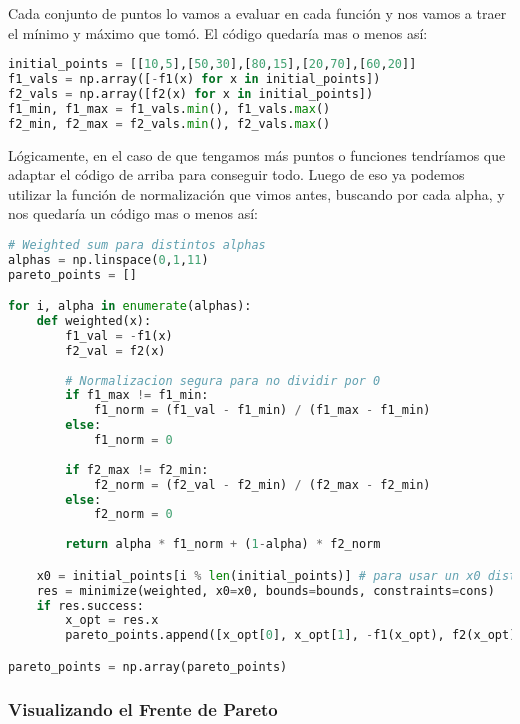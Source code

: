 \documentclass[12pt]{article}
\begin{document}
\vspace{0.5em}

Cada conjunto de puntos lo vamos a evaluar en cada función y nos vamos a traer el mínimo y máximo que tomó. El código quedaría mas o menos así:

\begin{lstlisting}[language=Python]
initial_points = [[10,5],[50,30],[80,15],[20,70],[60,20]]
f1_vals = np.array([-f1(x) for x in initial_points])
f2_vals = np.array([f2(x) for x in initial_points])
f1_min, f1_max = f1_vals.min(), f1_vals.max()
f2_min, f2_max = f2_vals.min(), f2_vals.max()
\end{lstlisting}

Lógicamente, en el caso de que tengamos más puntos o funciones tendríamos que adaptar el código de arriba para conseguir todo. Luego de eso ya podemos utilizar la función de normalización que vimos antes, buscando por cada alpha, y nos quedaría un código mas o menos así:

\begin{lstlisting}[language=Python]
# Weighted sum para distintos alphas
alphas = np.linspace(0,1,11)
pareto_points = []

for i, alpha in enumerate(alphas):
    def weighted(x):
        f1_val = -f1(x)
        f2_val = f2(x)
        
        # Normalizacion segura para no dividir por 0
        if f1_max != f1_min:
            f1_norm = (f1_val - f1_min) / (f1_max - f1_min)
        else:
            f1_norm = 0
        
        if f2_max != f2_min:
            f2_norm = (f2_val - f2_min) / (f2_max - f2_min)
        else:
            f2_norm = 0
        
        return alpha * f1_norm + (1-alpha) * f2_norm

    x0 = initial_points[i % len(initial_points)] # para usar un x0 distinto para cada alpha y poder explorar mejor el espacio
    res = minimize(weighted, x0=x0, bounds=bounds, constraints=cons)
    if res.success:
        x_opt = res.x
        pareto_points.append([x_opt[0], x_opt[1], -f1(x_opt), f2(x_opt)])

pareto_points = np.array(pareto_points)
\end{lstlisting}

\subsubsection{Visualizando el Frente de Pareto}
\end{document}
